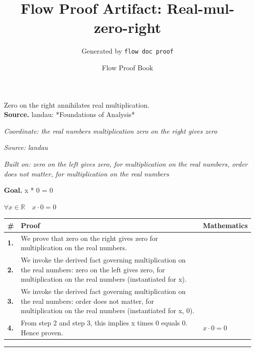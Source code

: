 \documentclass[11pt]{article}
\title{Flow Proof Artifact: Real-mul-zero-right}
\author{Generated by \texttt{flow doc proof}}
\date{Flow Proof Book}
\theoremstyle{definition}
\begin{document}
\maketitle
Zero on the right annihilates real multiplication.\\[0.5em]
\textbf{Source.} landau: *Foundations of Analysis*\\[0.5em]
\bigskip
{}\par
\smallskip\noindent\textit{Coordinate: the real numbers \cdot multiplication \cdot zero on the right gives zero}\par
\smallskip\noindent\textit{Source: landau}\par
\smallskip\noindent\textit{Built on: zero on the left gives zero, for multiplication on the real numbers, order does not matter, for multiplication on the real numbers}\par
\medskip
\noindent\textbf{Goal.} x * 0 = 0\par
\noindent$\displaystyle \forall x \in \mathbb{R}\quad x \cdot 0 = 0$\par
\medskip
\noindent
\begin{tabular}{@{} >{\raggedright\arraybackslash}p{} >{\raggedright\arraybackslash}p{} >{\raggedleft\arraybackslash}p{} @{}}
\textbf{\#} & \textbf{Proof} & \textbf{Mathematics} \\
\midrule
\textbf{1.} & We prove that zero on the right gives zero for multiplication on the real numbers. & \\[0.45em]
\textbf{2.} & We invoke the derived fact governing multiplication on the real numbers: zero on the left gives zero, for multiplication on the real numbers (instantiated for x). & \\[0.45em]
\textbf{3.} & We invoke the derived fact governing multiplication on the real numbers: order does not matter, for multiplication on the real numbers (instantiated for x, 0). & \\[0.45em]
\textbf{4.} & From step 2 and step 3, this implies x times 0 equals 0. Hence proven. & $\displaystyle x \cdot 0 = 0$ \\[0.45em]
\bottomrule
\end{tabular}
\label{thm:Real-multiplication-zero_on_the_right_gives_zero}
\par\medskip\hrule
\end{document}
